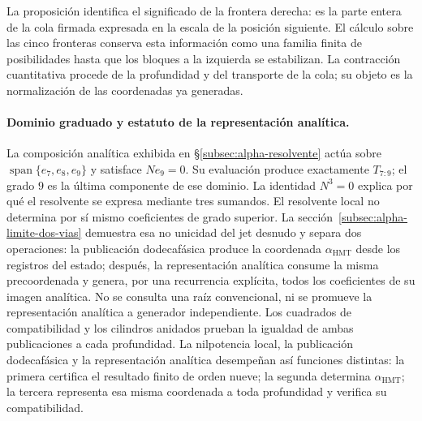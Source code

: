 La proposición identifica el significado de la frontera derecha: es la
parte entera de la cola firmada expresada en la escala de la posición
siguiente. El cálculo sobre las cinco fronteras conserva esta información
como una familia finita de posibilidades hasta que los bloques a la
izquierda se estabilizan. La contracción cuantitativa procede de la
profundidad y del transporte de la cola; su objeto es la normalización de
las coordenadas ya generadas.

\paragraph{Dominio graduado y estatuto de la representación analítica.}
\label{ampl-alfa-dominio-resolvente}
La composición analítica exhibida en
\S\ref{subsec:alpha-resolvente} actúa sobre
$\operatorname{span}\{e_7,e_8,e_9\}$ y satisface $Ne_9=0$. Su
evaluación produce exactamente $T_{7:9}$; el grado $9$ es la última
componente de ese dominio. La identidad $N^3=0$ explica por qué el
resolvente se expresa mediante tres sumandos. El resolvente local no determina
por sí mismo coeficientes de grado superior. La
sección~\ref{subsec:alpha-limite-dos-vias} demuestra esa no unicidad del jet
desnudo y separa dos operaciones: la publicación dodecafásica produce la
coordenada \(\alpha_{\mathrm{HMT}}\) desde los registros del estado; después,
la representación analítica consume la misma precoordenada y genera, por una
recurrencia explícita, todos los coeficientes de su imagen analítica. No se
consulta una raíz convencional, ni se promueve la representación analítica a
generador independiente. Los cuadrados de compatibilidad y los cilindros
anidados prueban la igualdad de ambas publicaciones a cada profundidad. La
nilpotencia local, la publicación dodecafásica y la representación analítica
desempeñan así funciones distintas: la primera certifica el resultado finito
de orden nueve; la segunda determina \(\alpha_{\mathrm{HMT}}\); la tercera
representa esa misma coordenada a toda profundidad y verifica su compatibilidad.
